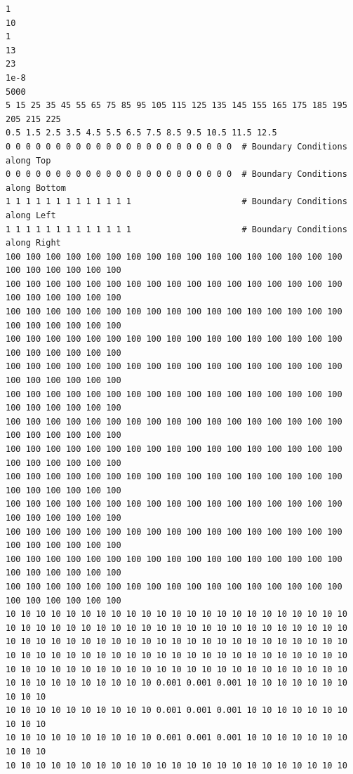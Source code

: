 \begin{lstlisting}[caption= Input file for 2D vertical slice confined aquifer with low permeability inclusion using a generalized boundary mask. The comments in the listing should be removed for running the program , label=lst:BoundaryInputFile]
1
10
1
13
23
1e-8
5000
5 15 25 35 45 55 65 75 85 95 105 115 125 135 145 155 165 175 185 195 205 215 225
0.5 1.5 2.5 3.5 4.5 5.5 6.5 7.5 8.5 9.5 10.5 11.5 12.5
0 0 0 0 0 0 0 0 0 0 0 0 0 0 0 0 0 0 0 0 0 0 0  # Boundary Conditions along Top
0 0 0 0 0 0 0 0 0 0 0 0 0 0 0 0 0 0 0 0 0 0 0  # Boundary Conditions along Bottom
1 1 1 1 1 1 1 1 1 1 1 1 1                      # Boundary Conditions along Left
1 1 1 1 1 1 1 1 1 1 1 1 1                      # Boundary Conditions along Right
100 100 100 100 100 100 100 100 100 100 100 100 100 100 100 100 100 100 100 100 100 100 100
100 100 100 100 100 100 100 100 100 100 100 100 100 100 100 100 100 100 100 100 100 100 100
100 100 100 100 100 100 100 100 100 100 100 100 100 100 100 100 100 100 100 100 100 100 100
100 100 100 100 100 100 100 100 100 100 100 100 100 100 100 100 100 100 100 100 100 100 100
100 100 100 100 100 100 100 100 100 100 100 100 100 100 100 100 100 100 100 100 100 100 100
100 100 100 100 100 100 100 100 100 100 100 100 100 100 100 100 100 100 100 100 100 100 100
100 100 100 100 100 100 100 100 100 100 100 100 100 100 100 100 100 100 100 100 100 100 100
100 100 100 100 100 100 100 100 100 100 100 100 100 100 100 100 100 100 100 100 100 100 100
100 100 100 100 100 100 100 100 100 100 100 100 100 100 100 100 100 100 100 100 100 100 100
100 100 100 100 100 100 100 100 100 100 100 100 100 100 100 100 100 100 100 100 100 100 100
100 100 100 100 100 100 100 100 100 100 100 100 100 100 100 100 100 100 100 100 100 100 100
100 100 100 100 100 100 100 100 100 100 100 100 100 100 100 100 100 100 100 100 100 100 100
100 100 100 100 100 100 100 100 100 100 100 100 100 100 100 100 100 100 100 100 100 100 100
10 10 10 10 10 10 10 10 10 10 10 10 10 10 10 10 10 10 10 10 10 10 10
10 10 10 10 10 10 10 10 10 10 10 10 10 10 10 10 10 10 10 10 10 10 10
10 10 10 10 10 10 10 10 10 10 10 10 10 10 10 10 10 10 10 10 10 10 10
10 10 10 10 10 10 10 10 10 10 10 10 10 10 10 10 10 10 10 10 10 10 10
10 10 10 10 10 10 10 10 10 10 10 10 10 10 10 10 10 10 10 10 10 10 10
10 10 10 10 10 10 10 10 10 10 0.001 0.001 0.001 10 10 10 10 10 10 10 10 10 10
10 10 10 10 10 10 10 10 10 10 0.001 0.001 0.001 10 10 10 10 10 10 10 10 10 10
10 10 10 10 10 10 10 10 10 10 0.001 0.001 0.001 10 10 10 10 10 10 10 10 10 10
10 10 10 10 10 10 10 10 10 10 10 10 10 10 10 10 10 10 10 10 10 10 10

\end{lstlisting}
